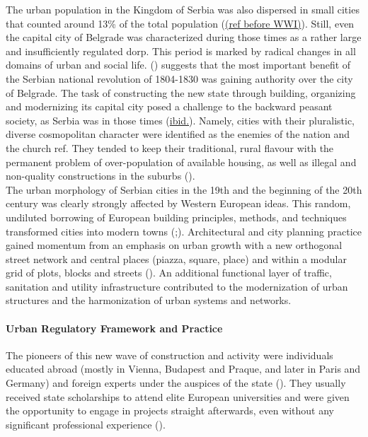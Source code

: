\documentclass[11pt]{report}
\begin{document}
The  urban  population  in  the  Kingdom  of  Serbia  was  also dispersed  in  small  cities that counted around 13\% of the total population (\href{ref}{(ref before WWI)}). Still, even the capital city of Belgrade was characterized during those times as a rather large and insufficiently regulated dorp.  This period is marked by radical changes in all domains of urban and social life.
(\href{Samardzic}{\citealt{doytchinov_belgrade_2015}}) suggests that the most important benefit of the Serbian national revolution of 1804-1830 was gaining authority over the city of Belgrade. The task of constructing the new state through building, organizing and modernizing its capital city posed a challenge to the backward peasant society, as Serbia was in those times  (\href{Samardzic}{ibid.}). Namely, cities with their pluralistic, diverse cosmopolitan character were identified as the enemies of the nation and the church ref. They tended to keep their traditional, rural flavour with the permanent problem of over-population of available housing, as well as illegal and non-quality constructions in the suburbs (\href{Doytchinov}{\citealt{doytchinov_modernization_2015}}).
\\  

The urban morphology of Serbian cities in the 19th and the beginning of the 20th century was clearly strongly affected by Western European ideas. This random, undiluted borrowing of European building principles, methods, and techniques transformed cities into modern towns  (\href{Nedovic}{\citealt{nedovicbudic_waves_2006}};\href{Kadijevic}{\citealt{kadijevic_jedan_2007}}). Architectural and city planning practice gained momentum from an emphasis on urban growth with a new orthogonal street network and central places (piazza, square, place) and within a modular grid of plots, blocks and streets (\href{Kadijevic}{\citealt{kadijevic_jedan_2007}}). An additional functional layer of traffic, sanitation and utility infrastructure contributed to the modernization of urban structures and the harmonization of urban systems and networks.

\paragraph{Urban Regulatory Framework and Practice}

The pioneers of this new wave of construction and activity were individuals educated abroad (mostly in Vienna, Budapest and Praque, and later in Paris and Germany) and foreign experts under the auspices of the state (\href{Maksimovic}{\citealt{maksimovic_idejni_1978}}). They usually received state scholarships to attend elite European universities and were given the opportunity to engage in projects straight afterwards, even without any significant professional experience (\href{Mladjenovic}{\citealt{mladjenovic_novija_????}}).
\\
\end{document}
